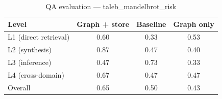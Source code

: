 \begin{table}[h]
\centering
\caption{QA evaluation — taleb_mandelbrot_risk}
\begin{tabular}{lccc}
\toprule
Level & Graph + store & Baseline & Graph only \\
\midrule
L1 (direct retrieval) & 0.60 & 0.33 & 0.53 \\
L2 (synthesis) & 0.87 & 0.47 & 0.40 \\
L3 (inference) & 0.47 & 0.73 & 0.33 \\
L4 (cross-domain) & 0.67 & 0.47 & 0.47 \\
\midrule
Overall & 0.65 & 0.50 & 0.43 \\
\bottomrule
\end{tabular}
\end{table}
